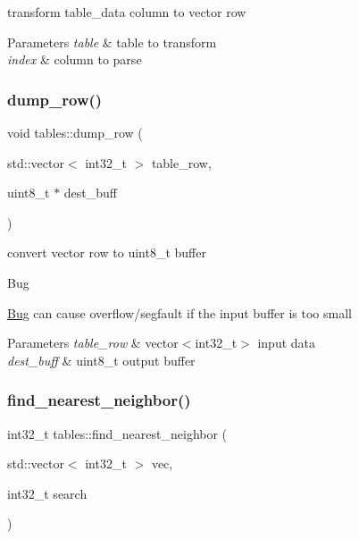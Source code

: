transform table\+\_\+data column to vector row 


\begin{DoxyParams}{Parameters}
{\em table} & table to transform \\
\hline
{\em index} & column to parse \\
\hline
\end{DoxyParams}
\mbox{\label{namespacetables_a3d4eae2328222f2672364baad17b14eb}} 
\subsubsection{\texorpdfstring{dump\+\_\+row()}{dump\_row()}}
{\footnotesize\ttfamily void tables\+::dump\+\_\+row (\begin{DoxyParamCaption}\item[{std\+::vector$<$ int32\+\_\+t $>$}]{table\+\_\+row,  }\item[{uint8\+\_\+t $\ast$}]{dest\+\_\+buff }\end{DoxyParamCaption})}



convert vector row to uint8\+\_\+t buffer 

\begin{DoxyRefDesc}{Bug}
\item[\hyperlink{bug__bug000001}{Bug}]can cause overflow/segfault if the input buffer is too small \end{DoxyRefDesc}

\begin{DoxyParams}{Parameters}
{\em table\+\_\+row} & vector$<$int32\+\_\+t$>$ input data \\
\hline
{\em dest\+\_\+buff} & uint8\+\_\+t output buffer \\
\hline
\end{DoxyParams}
\mbox{\label{namespacetables_a56f811fc2ad9ddcc8580af63abb9c200}} 
\subsubsection{\texorpdfstring{find\+\_\+nearest\+\_\+neighbor()}{find\_nearest\_neighbor()}}
{\footnotesize\ttfamily int32\+\_\+t tables\+::find\+\_\+nearest\+\_\+neighbor (\begin{DoxyParamCaption}\item[{std\+::vector$<$ int32\+\_\+t $>$}]{vec,  }\item[{int32\+\_\+t}]{search }\end{DoxyParamCaption})}



